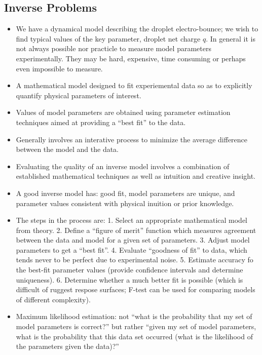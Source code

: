 \documentclass[10pt,a4paper]{article}
\begin{document}
\subsection{Inverse Problems}
\begin{itemize}
\item We have a dynamical model describing the droplet electro-bounce; we wish to find typical values of the key parameter, droplet net charge $q$. In general it is not always possible nor practicle to measure model parameters experimentally. They may be hard, expensive, time consuming or perhaps even impossible to measure. 
\item A mathematical model designed to fit experiemental data so as to explicitly quantify physical parameters of interest.
\item Values of model parameters are obtained using parameter estimation techniques aimed at providing a ``best fit'' to the data.
\item Generally involves an interative process to minimize the average difference between the model and the data.
\item Evaluating the quality of an inverse model involves a combination of established mathematical techniques as well as intuition and creative insight.
\item A good inverse model has: good fit, model parameters are unique, and parameter values consistent with physical inuition or prior knowledge.
\item The steps in the process are: 1. Select an appropriate mathematical model from theory. 2. Define a ``figure of merit'' function which measures agreement between the data and model for a given set of parameters. 3. Adjust model parameters to get a ``best fit''. 4. Evaluate ``goodness of fit'' to data, which tends never to be perfect due to experimental noise. 5. Estimate accuracy fo the best-fit parameter values (provide confidence intervals and determine uniqueness). 6. Determine whether a much better fit is possible (which is difficult of ruggest respose surfaces; F-test can be used for comparing models of different complexity).

\item Maximum likelihood estimation: not ``what is the probability that my set of model parameters is correct?'' but rather ``given my set of model parameters, what is the probability that this data set occurred (what is the likelihood of the parameters given the data)?''


\end{itemize}
\end{document}
